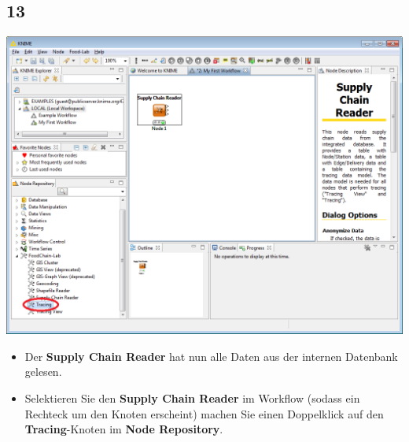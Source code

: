 \documentclass{beamer}
\begin{document}
\subsection{13}
\begin{frame}
	\begin{center}
  		\includegraphics[height=0.6\textheight]{13.png}
	\end{center}
	\begin{itemize}
		\item Der \textbf{Supply Chain Reader} hat nun alle Daten aus der internen Datenbank gelesen.
		\item Selektieren Sie den \textbf{Supply Chain Reader} im Workflow (sodass ein Rechteck um den Knoten erscheint) machen Sie einen Doppelklick auf den \textbf{Tracing}-Knoten im \textbf{Node Repository}.
	\end{itemize}
\end{frame}
\end{document}
